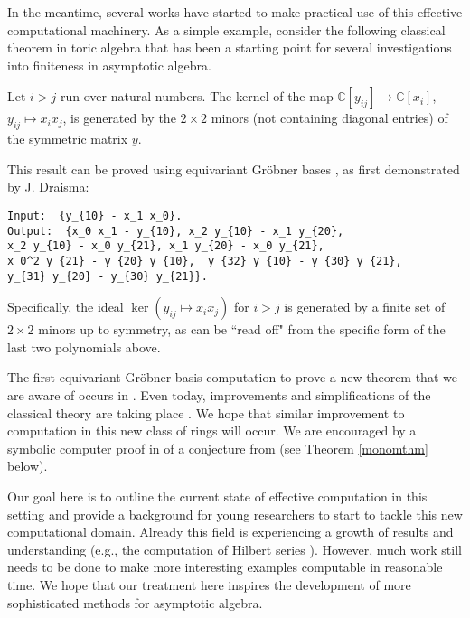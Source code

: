 In the meantime, several works have started to make practical use of this effective computational machinery.  As a simple example, consider 
the following classical theorem in toric algebra that has been a starting point for several investigations into finiteness in asymptotic algebra.

\begin{theorem}\label{toric2x2}
Let $i > j$ run over natural numbers.  The kernel of the map $\mathbb C[y_{ij}] \to \mathbb C[x_i]$, $y_{ij} \mapsto x_i x_j$, is generated by the $2 \times 2$ minors (not containing diagonal entries) of the symmetric matrix $y$.
\end{theorem}

This result can be proved using equivariant Gr\"obner bases \cite{}, as first demonstrated by J. Draisma:
\begin{M2}
\begin{verbatim}
Input:  {y_{10} - x_1 x_0}.
Output:  {x_0 x_1 - y_{10}, x_2 y_{10} - x_1 y_{20}, 
x_2 y_{10} - x_0 y_{21}, x_1 y_{20} - x_0 y_{21}, 
x_0^2 y_{21} - y_{20} y_{10},  y_{32} y_{10} - y_{30} y_{21}, 
y_{31} y_{20} - y_{30} y_{21}}.
\end{verbatim}
\end{M2}  
\medskip
Specifically, the ideal $\ker{(y_{ij} \mapsto x_i x_j)}$ for $i > j$ is generated by a finite set of $2 \times 2$ minors up to symmetry, 
as can be ``read off" from the specific form of the last two polynomials above.

The first equivariant Gr\"obner basis computation to prove a new theorem that we are aware of occurs in \cite{Brouwer09e}. Even today, improvements and simplifications of the classical theory are taking place \cite{schauenburg2007grobner}.  We hope that similar improvement to computation in this new class of rings will occur.  We are encouraged by a symbolic computer proof in \cite{draisma2013noetherianity} of a conjecture from \cite{aschenbrenner2007finite} (see Theorem \ref{monomthm} below).

Our goal here is to outline the current state of effective computation in this setting and provide a background for young researchers to start to tackle this new computational domain.  Already this field is experiencing a growth of results and understanding (e.g., the computation of Hilbert series \cite{Nagel, krone2016hilbert}).  However, much work still needs to be done to make more interesting examples computable in reasonable time.  We hope that our treatment here inspires the development of more sophisticated methods for asymptotic algebra.

